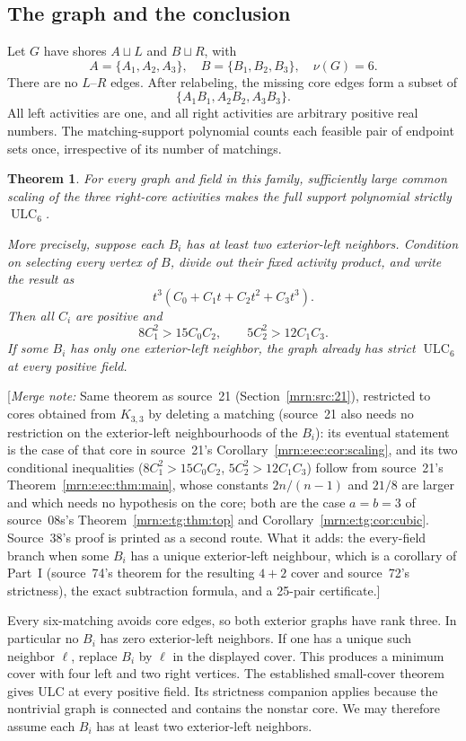 \documentclass[11pt,a4paper]{article}
\newtheorem{theorem}{Theorem}[section]
\theoremstyle{remark}\newtheorem{remark}[theorem]{Remark}
\newcommand{\ULC}{\operatorname{ULC}}      %
\newcommand{\mnote}[1]{[\textit{Merge note:} #1]}
\begin{document}
\subsection{The graph and the conclusion}
Let $G$ have shores $A\sqcup L$ and $B\sqcup R$, with
\[
 A=\{A_1,A_2,A_3\},\quad B=\{B_1,B_2,B_3\},\quad \nu(G)=6.
\]
There are no $L$--$R$ edges. After relabeling, the missing core edges form a subset of
\[
 \{A_1B_1,A_2B_2,A_3B_3\}.
\]
All left activities are one, and all right activities are arbitrary positive real numbers. The matching-support polynomial counts each feasible pair of endpoint sets once, irrespective of its number of matchings.

\begin{theorem}\label{mrn:e:mh:thm:main}
For every graph and field in this family, sufficiently large common scaling of the three right-core activities makes the full support polynomial strictly $\ULC_6$.

More precisely, suppose each $B_i$ has at least two exterior-left neighbors. Condition on selecting every vertex of $B$, divide out their fixed activity product, and write the result as
\[
 t^3(C_0+C_1t+C_2t^2+C_3t^3).
\]
Then all $C_i$ are positive and
\begin{equation}\label{mrn:e:mh:eq:targets}
 8C_1^2>15C_0C_2,\qquad 5C_2^2>12C_1C_3.
\end{equation}
If some $B_i$ has only one exterior-left neighbor, the graph already has strict $\ULC_6$ at every positive field.
\end{theorem}
\mnote{Same theorem as source~21 (Section~\ref{mrn:src:21}), restricted to cores obtained from $K_{3,3}$ by deleting a matching (source~21 also needs no restriction on the exterior-left neighbourhoods of the $B_i$): its eventual statement is the case of that core in source~21's Corollary~\ref{mrn:e:ec:cor:scaling}, and its two conditional inequalities ($8C_1^2>15C_0C_2$, $5C_2^2>12C_1C_3$) follow from source~21's Theorem~\ref{mrn:e:ec:thm:main}, whose constants $2n/(n-1)$ and $21/8$ are larger and which needs no hypothesis on the core; both are the case $a=b=3$ of source~08s's Theorem~\ref{mrn:e:tg:thm:top} and Corollary~\ref{mrn:e:tg:cor:cubic}. Source~38's proof is printed as a second route. What it adds: the every-field branch when some $B_i$ has a unique exterior-left neighbour, which is a corollary of Part~I (source~74's theorem for the resulting $4+2$ cover and source~72's strictness), the exact subtraction formula, and a 25-pair certificate.}

Every six-matching avoids core edges, so both exterior graphs have rank three. In particular no $B_i$ has zero exterior-left neighbors. If one has a unique such neighbor $\ell$, replace $B_i$ by $\ell$ in the displayed cover. This produces a minimum cover with four left and two right vertices. The established small-cover theorem \cite{b:m74} gives ULC at every positive field. Its strictness companion \cite{b:m72} applies because the nontrivial graph is connected and contains the nonstar core. We may therefore assume each $B_i$ has at least two exterior-left neighbors.
\end{document}
